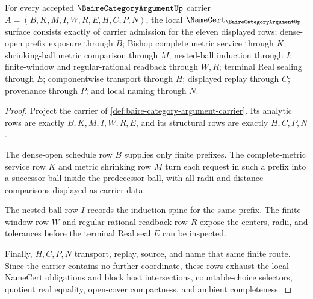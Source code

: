 \begin{theorem}
\label{thm:baire-category-argument-namecert-obligations}
For every accepted $\BaireCategoryArgumentUp$ carrier $A=(B,K,M,I,W,R,E,H,C,P,N)$, the local $\NameCert_{\BaireCategoryArgumentUp}$ surface consists exactly of carrier admission for the eleven displayed rows; dense-open prefix exposure through $B$; Bishop complete metric service through $K$; shrinking-ball metric comparison through $M$; nested-ball induction through $I$; finite-window and regular-rational readback through $W,R$; terminal Real sealing through $E$; componentwise transport through $H$; displayed replay through $C$; provenance through $P$; and local naming through $N$.
\end{theorem}
\begin{proof}
Project the carrier of \autoref{def:baire-category-argument-carrier}. Its analytic rows are exactly $B,K,M,I,W,R,E$, and its structural rows are exactly $H,C,P,N$.

The dense-open schedule row $B$ supplies only finite prefixes. The complete-metric service row $K$ and metric shrinking row $M$ turn each request in such a prefix into a successor ball inside the predecessor ball, with all radii and distance comparisons displayed as carrier data.

The nested-ball row $I$ records the induction spine for the same prefix. The finite-window row $W$ and regular-rational readback row $R$ expose the centers, radii, and tolerances before the terminal Real seal $E$ can be inspected.

Finally, $H,C,P,N$ transport, replay, source, and name that same finite route. Since the carrier contains no further coordinate, these rows exhaust the local NameCert obligations and block host intersections, countable-choice selectors, quotient real equality, open-cover compactness, and ambient completeness.
\end{proof}

